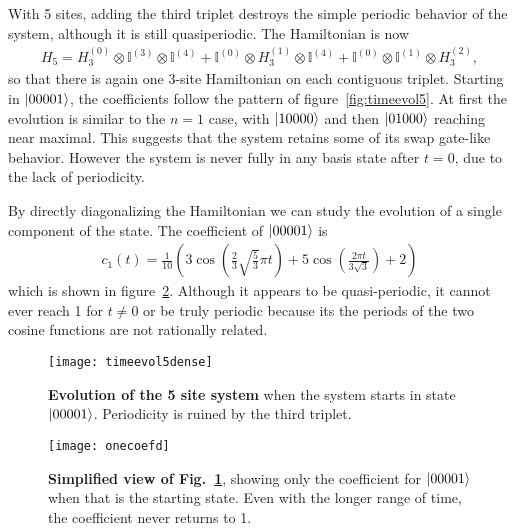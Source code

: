 With 5 sites, adding the third triplet destroys the simple periodic behavior of the system, although it is still quasiperiodic. The Hamiltonian is now
\begin{align}
H_5 = H_3^{(0)}\otimes\mathbb{I}^{(3)}\otimes\mathbb{I}^{(4)} + 
	\mathbb{I}^{(0)}\otimes H_3^{(1)}\otimes\mathbb{I}^{(4)} +
	\mathbb{I}^{(0)}\otimes\mathbb{I}^{(1)}\otimes H_3^{(2)},
\end{align} 
so that there is again one 3-site Hamiltonian on each contiguous triplet.
Starting in $\left|00001\right\rangle$, the coefficients follow the pattern of figure~\ref{fig:timeevol5}. At first the evolution is similar to the $n=1$ case, with $\left|10000\right\rangle$ and then $\left|01000\right\rangle$ reaching near maximal. This suggests that the system retains some of its swap gate-like behavior. However the system is never fully in any basis state after $t=0$, due to the lack of periodicity.

By directly diagonalizing the Hamiltonian we can study the evolution of a single component of the state. The coefficient of $\left|00001\right\rangle$ is 
\begin{align}
c_1(t) = \frac{1}{10} \left(3 \cos \left(\frac{2}{3} \sqrt{\frac{5}{3}} \pi  t\right)+5 \cos \left(\frac{2 \pi  t}{3 \sqrt{3}}\right)+2\right)
\end{align} 
which is shown in figure~\ref{fig:onecoef}. Although it appears to be quasi-periodic, it cannot ever reach 1 for $t\ne 0$ or be truly periodic because its the periods of the two cosine functions are not rationally related.

\begin{figure}
	\centering
	\texttt{[image: timeevol5dense]}
	\caption{\textbf{Evolution of the 5 site system} when the system starts in state $\left|00001\right\rangle$. Periodicity is ruined by the third triplet.}
	\label{fig:timeevol5dense}
\end{figure}

\begin{figure}
	\centering
	\texttt{[image: onecoefd]}
	\caption{\textbf{Simplified view of Fig.~\ref{fig:timeevol5dense}}, showing only the coefficient for $\left|00001\right\rangle$ when that is the starting state. Even with the longer range of time, the coefficient never returns to 1.}
	\label{fig:onecoef}
\end{figure}

